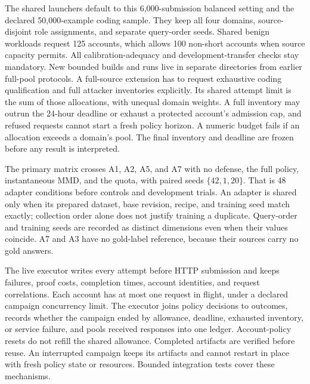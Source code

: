 \documentclass[journal]{IEEEtran}
\begin{document}
The shared launchers default to this 6,000-submission balanced setting and the declared 50,000-example coding sample. They keep all four domains, source-disjoint role assignments, and separate query-order seeds. Shared benign workloads request 125 accounts, which allows 100 non-short accounts when source capacity permits. All calibration-adequacy and development-transfer checks stay mandatory. New bounded builds and runs live in separate directories from earlier full-pool protocols. A full-source extension has to request exhaustive coding qualification and full attacker inventories explicitly. Its shared attempt limit is the sum of those allocations, with unequal domain weights. A full inventory may outrun the 24-hour deadline or exhaust a protected account's admission cap, and refused requests cannot start a fresh policy horizon. A numeric budget fails if an allocation exceeds a domain's pool. The final inventory and deadline are frozen before any result is interpreted.

The primary matrix crosses A1, A2, A5, and A7 with no defense, the full policy, instantaneous MMD, and the quota, with paired seeds $\{42,1,20\}$. That is 48 adapter conditions before controls and development trials. An adapter is shared only when its prepared dataset, base revision, recipe, and training seed match exactly; collection order alone does not justify training a duplicate. Query-order and training seeds are recorded as distinct dimensions even when their values coincide. A7 and A3 have no gold-label reference, because their sources carry no gold answers.

The live executor writes every attempt before HTTP submission and keeps failures, proof costs, completion times, account identities, and request correlations. Each account has at most one request in flight, under a declared campaign concurrency limit. The executor joins policy decisions to outcomes, records whether the campaign ended by allowance, deadline, exhausted inventory, or service failure, and pools received responses into one ledger. Account-policy resets do not refill the shared allowance. Completed artifacts are verified before reuse. An interrupted campaign keeps its artifacts and cannot restart in place with fresh policy state or resources. Bounded integration tests cover these mechanisms.
\end{document}
